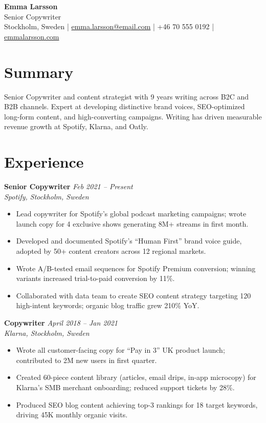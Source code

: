 \documentclass[11pt,a4paper]{article}
\begin{document}
\begin{center}
  {\LARGE \textbf{Emma Larsson}}\\[3pt]
  {\large \textcolor{accent}{Senior Copywriter}}\\[4pt]
  Stockholm, Sweden \quad|\quad
  \href{mailto:emma.larsson@email.com}{emma.larsson@email.com} \quad|\quad
  +46 70 555 0192 \quad|\quad
  \href{https://emmalarsson.com}{emmalarsson.com}
\end{center}

\section{Summary}
Senior Copywriter and content strategist with 9 years writing across B2C and B2B channels. Expert at developing distinctive brand voices, SEO-optimized long-form content, and high-converting campaigns. Writing has driven measurable revenue growth at Spotify, Klarna, and Oatly.

\section{Experience}

\noindent\textbf{Senior Copywriter} \hfill \textit{Feb 2021 -- Present}\\
\textit{Spotify, Stockholm, Sweden}
\begin{itemize}
  \item Lead copywriter for Spotify's global podcast marketing campaigns; wrote launch copy for 4 exclusive shows generating 8M+ streams in first month.
  \item Developed and documented Spotify's ``Human First'' brand voice guide, adopted by 50+ content creators across 12 regional markets.
  \item Wrote A/B-tested email sequences for Spotify Premium conversion; winning variants increased trial-to-paid conversion by 11\%.
  \item Collaborated with data team to create SEO content strategy targeting 120 high-intent keywords; organic blog traffic grew 210\% YoY.
\end{itemize}

\vspace{4pt}
\noindent\textbf{Copywriter} \hfill \textit{April 2018 -- Jan 2021}\\
\textit{Klarna, Stockholm, Sweden}
\begin{itemize}
  \item Wrote all customer-facing copy for ``Pay in 3'' UK product launch; contributed to 2M new users in first quarter.
  \item Created 60-piece content library (articles, email drips, in-app microcopy) for Klarna's SMB merchant onboarding; reduced support tickets by 28\%.
  \item Produced SEO blog content achieving top-3 rankings for 18 target keywords, driving 45K monthly organic visits.
\end{itemize}
\end{document}
